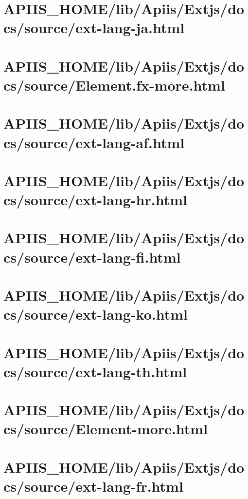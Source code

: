 \section{APIIS\_HOME/lib/Apiis/Extjs/docs/source/ext-lang-ja.html} 
\section{APIIS\_HOME/lib/Apiis/Extjs/docs/source/Element.fx-more.html} 
\section{APIIS\_HOME/lib/Apiis/Extjs/docs/source/ext-lang-af.html} 
\section{APIIS\_HOME/lib/Apiis/Extjs/docs/source/ext-lang-hr.html} 
\section{APIIS\_HOME/lib/Apiis/Extjs/docs/source/ext-lang-fi.html} 
\section{APIIS\_HOME/lib/Apiis/Extjs/docs/source/ext-lang-ko.html} 
\section{APIIS\_HOME/lib/Apiis/Extjs/docs/source/ext-lang-th.html} 
\section{APIIS\_HOME/lib/Apiis/Extjs/docs/source/Element-more.html} 
\section{APIIS\_HOME/lib/Apiis/Extjs/docs/source/ext-lang-fr.html} 
